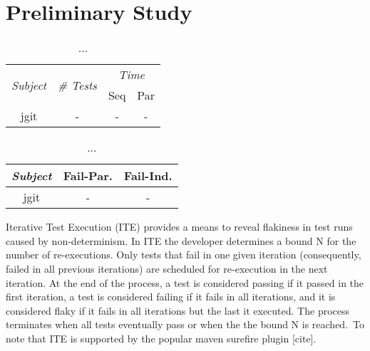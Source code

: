 \section{Preliminary Study}

\begin{table}
  \centering
  \begin{tabular}{|c|c|c|c|}
    \hline
    \multirow{2}{*}{\emph{Subject}} & \multirow{2}{*}{\emph{\# Tests}} &  \multicolumn{2}{c|}{\emph{Time}}\\
    \cline{3-4}
    & & Seq & Par \\
    \hline
    jgit & - & - & - \\
    \hline
  \end{tabular}
  \caption{\label{table:cost}...}
\end{table}

\begin{table}
  \centering
  \begin{tabular}{|c|c|c|}
    \hline
    \emph{Subject} & Fail-Par. & Fail-Ind. \\
    \hline
    jgit & - & - \\
    \hline
  \end{tabular}
  \caption{\label{table:failures}...}
\end{table}

Iterative Test Execution (ITE) provides a means to reveal flakiness in
test runs caused by non-determinism.  In ITE the developer determines
a bound N for the number of re-executions.  Only tests that fail in
one given iteration (consequently, failed in all previous iterations)
are scheduled for re-execution in the next iteration.  At the end of
the process, a test is considered passing if it passed in the first
iteration, a test is considered failing if it fails in all iterations,
and it is considered flaky if it fails in all iterations but the last
it executed.  The process terminates when all tests eventually pass or
when the the bound N is reached.~To note that ITE is supported by the popular maven
surefire plugin [cite].

